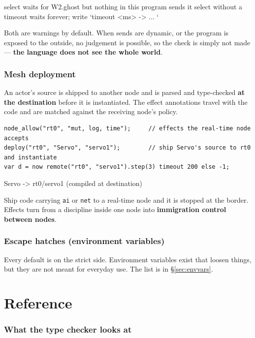 \documentclass[11pt,a4paper]{article}
\begin{document}
\begin{term}
select waits for W2.ghost but nothing in this program sends it
select without a timeout waits forever; write `timeout <ms> -> { ... }`
\end{term}

Both are warnings by default. When sends are dynamic, or the program is exposed
to the outside, no judgement is possible, so the check is simply not made ---
\textbf{the language does not see the whole world}.

\section{Mesh deployment}
\label{sec:mesh}

An actor's source is shipped to another node and is parsed and type-checked
\textbf{at the destination} before it is instantiated. The effect annotations
travel with the code and are matched against the receiving node's policy.

\begin{lstlisting}
node_allow("rt0", "mut, log, time");     // effects the real-time node accepts
deploy("rt0", "Servo", "servo1");        // ship Servo's source to rt0 and instantiate
var d = now remote("rt0", "servo1").step(3) timeout 200 else -1;
\end{lstlisting}

\begin{term}
[deploy] Servo -> rt0/servo1 (compiled at destination)
\end{term}

Ship code carrying \texttt{ai} or \texttt{net} to a real-time node and it is
stopped at the border. Effects turn from a discipline inside one node into
\textbf{immigration control between nodes}.

\section{Escape hatches (environment variables)}
\label{sec:escape}

Every default is on the strict side. Environment variables exist that loosen
things, but they are not meant for everyday use. The list is in
\S\ref{sec:envvars}.

\part{Reference}

\section{What the type checker looks at}
\end{document}
